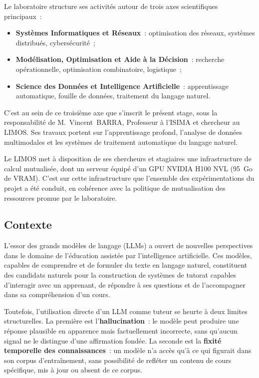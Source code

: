 \documentclass[11pt,a4paper]{article}
\begin{document}
Le laboratoire structure ses activités autour de trois axes scientifiques principaux~:
\begin{itemize}
  \item \textbf{Systèmes Informatiques et Réseaux}~: optimisation des réseaux, systèmes distribués, cybersécurité~;
  \item \textbf{Modélisation, Optimisation et Aide à la Décision}~: recherche opérationnelle, optimisation combinatoire, logistique~;
  \item \textbf{Science des Données et Intelligence Artificielle}~: apprentissage automatique, fouille de données, traitement du langage naturel.
\end{itemize}

C'est au sein de ce troisième axe que s'inscrit le présent stage, sous la responsabilité de M.~Vincent~BARRA, Professeur à l'ISIMA et chercheur au LIMOS. Ses travaux portent sur l'apprentissage profond, l'analyse de données multimodales et les systèmes de traitement automatique du langage naturel.

Le LIMOS met à disposition de ses chercheurs et stagiaires une infrastructure de calcul mutualisée, dont un serveur équipé d'un GPU NVIDIA H100 NVL (95~Go de VRAM). C'est sur cette infrastructure que l'ensemble des expérimentations du projet a été conduit, en cohérence avec la politique de mutualisation des ressources promue par le laboratoire.

\subsection{Contexte}

L'essor des grands modèles de langage (LLMs) a ouvert de nouvelles perspectives dans le domaine de l'éducation assistée par l'intelligence artificielle. Ces modèles, capables de comprendre et de formuler du texte en langage naturel, constituent des candidats naturels pour la construction de systèmes de tutorat capables d'interagir avec un apprenant, de répondre à ses questions et de l'accompagner dans sa compréhension d'un cours.

Toutefois, l'utilisation directe d'un LLM comme tuteur se heurte à deux limites structurelles. La première est l'\textbf{hallucination}~: le modèle peut produire une réponse plausible en apparence mais factuellement incorrecte, sans qu'aucun signal ne le distingue d'une affirmation fondée. La seconde est la \textbf{fixité temporelle des connaissances}~: un modèle n'a accès qu'à ce qui figurait dans son corpus d'entraînement, sans possibilité de refléter un contenu de cours spécifique, mis à jour ou absent de ce corpus.
\end{document}

